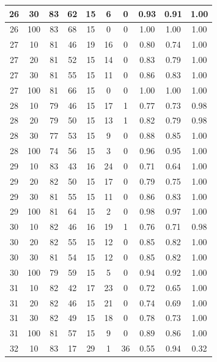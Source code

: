 \begin{longtable}{ |c|c|c|c|c|c|c|c|c|c| }
            26 & 30 & 83 & 62 & 15 & 6 & 0 & 0.93 & 0.91 & 1.00 \\ \hline
            26 & 100 & 83 & 68 & 15 & 0 & 0 & 1.00 & 1.00 & 1.00 \\ \hline
            27 & 10 & 81 & 46 & 19 & 16 & 0 & 0.80 & 0.74 & 1.00 \\ \hline
            27 & 20 & 81 & 52 & 15 & 14 & 0 & 0.83 & 0.79 & 1.00 \\ \hline
            27 & 30 & 81 & 55 & 15 & 11 & 0 & 0.86 & 0.83 & 1.00 \\ \hline
            27 & 100 & 81 & 66 & 15 & 0 & 0 & 1.00 & 1.00 & 1.00 \\ \hline
            28 & 10 & 79 & 46 & 15 & 17 & 1 & 0.77 & 0.73 & 0.98 \\ \hline
            28 & 20 & 79 & 50 & 15 & 13 & 1 & 0.82 & 0.79 & 0.98 \\ \hline
            28 & 30 & 77 & 53 & 15 & 9 & 0 & 0.88 & 0.85 & 1.00 \\ \hline
            28 & 100 & 74 & 56 & 15 & 3 & 0 & 0.96 & 0.95 & 1.00 \\ \hline
            29 & 10 & 83 & 43 & 16 & 24 & 0 & 0.71 & 0.64 & 1.00 \\ \hline
            29 & 20 & 82 & 50 & 15 & 17 & 0 & 0.79 & 0.75 & 1.00 \\ \hline
            29 & 30 & 81 & 55 & 15 & 11 & 0 & 0.86 & 0.83 & 1.00 \\ \hline
            29 & 100 & 81 & 64 & 15 & 2 & 0 & 0.98 & 0.97 & 1.00 \\ \hline
            30 & 10 & 82 & 46 & 16 & 19 & 1 & 0.76 & 0.71 & 0.98 \\ \hline
            30 & 20 & 82 & 55 & 15 & 12 & 0 & 0.85 & 0.82 & 1.00 \\ \hline
            30 & 30 & 81 & 54 & 15 & 12 & 0 & 0.85 & 0.82 & 1.00 \\ \hline
            30 & 100 & 79 & 59 & 15 & 5 & 0 & 0.94 & 0.92 & 1.00 \\ \hline
            31 & 10 & 82 & 42 & 17 & 23 & 0 & 0.72 & 0.65 & 1.00 \\ \hline
            31 & 20 & 82 & 46 & 15 & 21 & 0 & 0.74 & 0.69 & 1.00 \\ \hline
            31 & 30 & 82 & 49 & 15 & 18 & 0 & 0.78 & 0.73 & 1.00 \\ \hline
            31 & 100 & 81 & 57 & 15 & 9 & 0 & 0.89 & 0.86 & 1.00 \\ \hline
            32 & 10 & 83 & 17 & 29 & 1 & 36 & 0.55 & 0.94 & 0.32 \\ \hline

\end{longtable}
